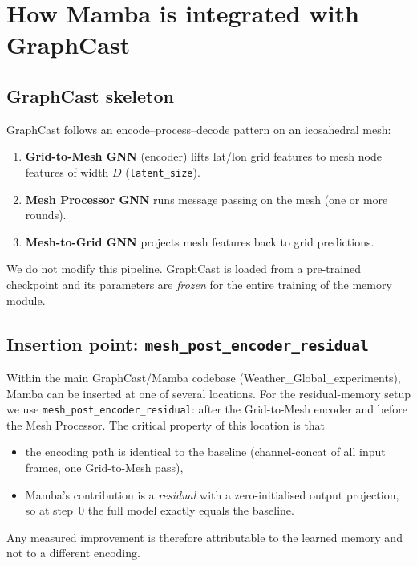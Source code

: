 \documentclass[11pt,a4paper]{article}
\begin{document}
\section{How Mamba is integrated with GraphCast}

\subsection{GraphCast skeleton}

GraphCast follows an encode--process--decode pattern on an icosahedral mesh:
\begin{enumerate}[nosep]
  \item \textbf{Grid-to-Mesh GNN} (encoder) lifts lat/lon grid features to mesh node features of width $D$ (\texttt{latent\_size}).
  \item \textbf{Mesh Processor GNN} runs message passing on the mesh (one or more rounds).
  \item \textbf{Mesh-to-Grid GNN} projects mesh features back to grid predictions.
\end{enumerate}

We do not modify this pipeline. GraphCast is loaded from a pre-trained checkpoint and its parameters are \emph{frozen} for the entire training of the memory module.

\subsection{Insertion point: \texttt{mesh\_post\_encoder\_residual}}

Within the main GraphCast/Mamba codebase (Weather\_Global\_experiments), Mamba can be inserted at one of several locations. For the residual-memory setup we use \texttt{mesh\_post\_encoder\_residual}: after the Grid-to-Mesh encoder and before the Mesh Processor. The critical property of this location is that
\begin{itemize}[nosep]
  \item the encoding path is identical to the baseline (channel-concat of all input frames, one Grid-to-Mesh pass),
  \item Mamba's contribution is a \emph{residual} with a zero-initialised output projection, so at step~0 the full model exactly equals the baseline.
\end{itemize}
Any measured improvement is therefore attributable to the learned memory and not to a different encoding.
\end{document}
